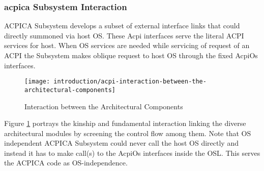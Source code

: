 \subsubsection{\gls{acpica} Subsystem Interaction}
ACPICA Subsystem develops a subset of external interface links that could directly summoned via host OS. These Acpi interfaces serve the literal ACPI services for host. When OS services are needed while servicing of request of an ACPI the Subsystem makes oblique request to host OS through the fixed AcpiOs interfaces. 

\begin{figure}[!htbp]
  \centering
  \texttt{[image: introduction/acpi-interaction-between-the-architectural-components]}
  \caption{Interaction between the Architectural Components}\label{fig:-introduction-acpi-interaction-between-the-architectural-components}
\end{figure}

Figure \ref{fig:-introduction-acpi-interaction-between-the-architectural-components} portrays the kinship and fundamental interaction linking the diverse architectural modules by screening the control flow among them. Note that OS independent ACPICA Subsystem could never call the host OS directly and instead it has to make call(s) to the AcpiOs interfaces inside the OSL. This serves the ACPICA code as OS-independence.
